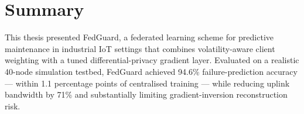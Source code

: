 \section{Summary}
This thesis presented FedGuard, a federated learning scheme for predictive maintenance
in industrial IoT settings that combines volatility-aware client weighting with a
tuned differential-privacy gradient layer. Evaluated on a realistic 40-node simulation
testbed, FedGuard achieved 94.6\% failure-prediction accuracy — within 1.1 percentage
points of centralised training — while reducing uplink bandwidth by 71\% and
substantially limiting gradient-inversion reconstruction risk.
